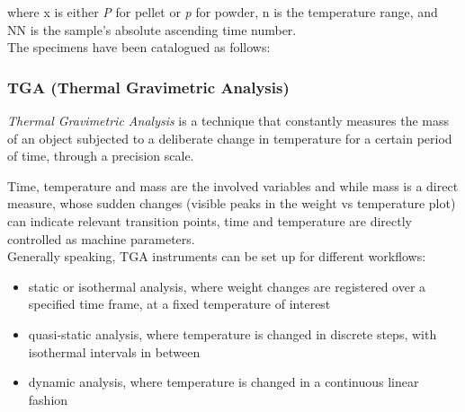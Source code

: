 \documentclass{article}
\begin{document}
                where x is either \textit{P} for pellet or \textit{p} for powder, n is the temperature range, and NN is the sample's absolute 
                ascending time number. \\

                The specimens have been catalogued as follows: 

                \begin{table}[h!]
              \caption{DSC specimens}
              \label{tab:DSC_ID}
              \end{table} 

              \clearpage

        \subsubsection{TGA (Thermal Gravimetric Analysis)\label{TGA_Analysis}}
        
        \textit{Thermal Gravimetric Analysis} is a technique that constantly measures the mass of an object subjected to a deliberate 
        change in temperature for a certain period of time, through a precision scale. 

        Time, temperature and mass are the involved variables and while mass is a direct measure, whose sudden changes (visible peaks
        in the weight vs temperature plot) can indicate relevant transition points, time and temperature are directly controlled 
        as machine parameters. \\ 

        Generally speaking, TGA instruments can be set up for different workflows: 

                \begin{itemize}
                    \item static or isothermal analysis, where weight changes are registered over a specified time frame, 
                    at a fixed temperature of interest
                    \item quasi-static analysis, where temperature is changed in discrete steps, with isothermal intervals in between 
                    \item dynamic analysis, where temperature is changed in a continuous linear fashion
                \end{itemize}
\end{document}
